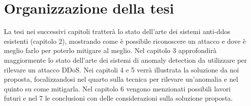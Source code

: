 \section{Organizzazione della tesi}

La tesi nei successivi capitoli tratterà lo stato dell'arte dei sistemi anti-ddos esistenti (capitolo 2), mostrando come è possibile riconoscere un attacco e dove è meglio farlo per poterlo mitigare al meglio. Nel capitolo 3 approfondirà maggiormente lo stato dell'arte dei sistemi di anomaly detection da utilizzare per rilevare un attacco DDoS.
Nei capitoli 4 e 5 verrà illustrata la soluzione da noi proposta, focalizzandosi nel quarto sulla tecnica per rilevare un'anomalia e nel quinto su come mitigarla.
Nel capitolo 6 vengono menzionati possibili lavori futuri e nel 7 le conclusioni con delle considerazioni sulla soluzione proposta.